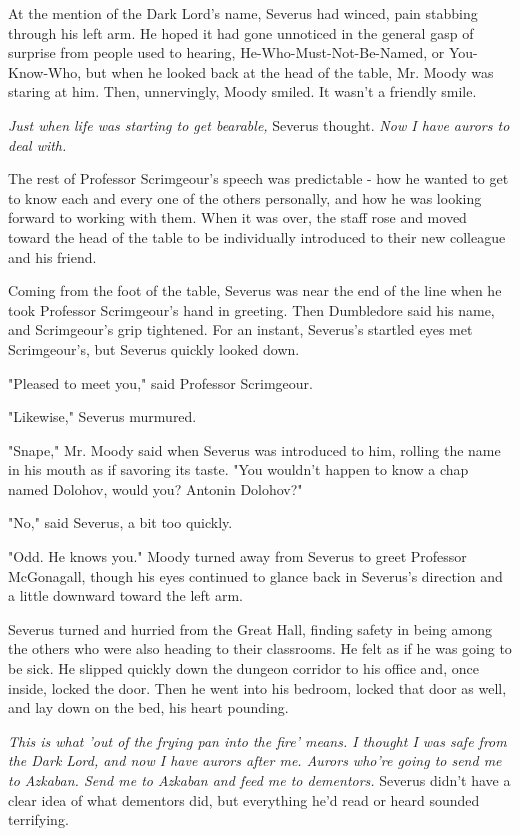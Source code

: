 \documentclass[a4paper,11pt]{article}
\begin{document}
At the mention of the Dark Lord's name, Severus had winced, pain stabbing through his left arm. He hoped it had gone unnoticed in the general gasp of surprise from people used to hearing, He-Who-Must-Not-Be-Named, or You-Know-Who, but when he looked back at the head of the table, Mr. Moody was staring at him. Then, unnervingly, Moody smiled. It wasn't a friendly smile.

\emph{Just when life was starting to get bearable,} Severus thought. \emph{Now I have aurors to deal with.}

The rest of Professor Scrimgeour's speech was predictable - how he wanted to get to know each and every one of the others personally, and how he was looking forward to working with them. When it was over, the staff rose and moved toward the head of the table to be individually introduced to their new colleague and his friend.

Coming from the foot of the table, Severus was near the end of the line when he took Professor Scrimgeour's hand in greeting. Then Dumbledore said his name, and Scrimgeour's grip tightened. For an instant, Severus's startled eyes met Scrimgeour's, but Severus quickly looked down.

"Pleased to meet you," said Professor Scrimgeour.

"Likewise," Severus murmured.

"Snape," Mr. Moody said when Severus was introduced to him, rolling the name in his mouth as if savoring its taste. "You wouldn't happen to know a chap named Dolohov, would you? Antonin Dolohov?"

"No," said Severus, a bit too quickly.

"Odd. He knows you." Moody turned away from Severus to greet Professor McGonagall, though his eyes continued to glance back in Severus's direction and a little downward toward the left arm.

Severus turned and hurried from the Great Hall, finding safety in being among the others who were also heading to their classrooms. He felt as if he was going to be sick. He slipped quickly down the dungeon corridor to his office and, once inside, locked the door. Then he went into his bedroom, locked that door as well, and lay down on the bed, his heart pounding.

\emph{This is what 'out of the frying pan into the fire' means. I thought I was safe from the Dark Lord, and now I have aurors after me. Aurors who're going to send me to Azkaban. Send me to Azkaban and feed me to dementors.} Severus didn't have a clear idea of what dementors did, but everything he'd read or heard sounded terrifying.
\end{document}
